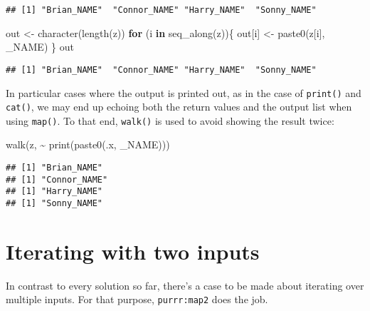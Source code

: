 \documentclass[
]{book}
\newenvironment{Shaded}{\begin{snugshade}}{\end{snugshade}}
\newcommand{\ControlFlowTok}[1]{\textcolor[rgb]{0.13,0.29,0.53}{\textbf{#1}}}
\newcommand{\FunctionTok}[1]{\textcolor[rgb]{0.00,0.00,0.00}{#1}}
\newcommand{\NormalTok}[1]{#1}
\newcommand{\OtherTok}[1]{\textcolor[rgb]{0.56,0.35,0.01}{#1}}
\newcommand{\SpecialCharTok}[1]{\textcolor[rgb]{0.00,0.00,0.00}{#1}}
\newcommand{\StringTok}[1]{\textcolor[rgb]{0.31,0.60,0.02}{#1}}
\begin{document}
\begin{verbatim}
## [1] "Brian_NAME"  "Connor_NAME" "Harry_NAME"  "Sonny_NAME"
\end{verbatim}

\begin{Shaded}
\begin{Highlighting}[]
\NormalTok{out }\OtherTok{\textless{}{-}} \FunctionTok{character}\NormalTok{(}\FunctionTok{length}\NormalTok{(z))}
\ControlFlowTok{for}\NormalTok{ (i }\ControlFlowTok{in} \FunctionTok{seq\_along}\NormalTok{(z))\{}
\NormalTok{  out[i] }\OtherTok{\textless{}{-}} \FunctionTok{paste0}\NormalTok{(z[i], }\StringTok{\textquotesingle{}\_NAME\textquotesingle{}}\NormalTok{)}
\NormalTok{\}}
\NormalTok{out}
\end{Highlighting}
\end{Shaded}

\begin{verbatim}
## [1] "Brian_NAME"  "Connor_NAME" "Harry_NAME"  "Sonny_NAME"
\end{verbatim}

In particular cases where the output is printed out, as in the case of \texttt{print()} and \texttt{cat()}, we may end up echoing both the return values and the output list when using \texttt{map()}. To that end, \texttt{walk()} is used to avoid showing the result twice:

\begin{Shaded}
\begin{Highlighting}[]
\FunctionTok{walk}\NormalTok{(z, }\SpecialCharTok{\textasciitilde{}} \FunctionTok{print}\NormalTok{(}\FunctionTok{paste0}\NormalTok{(.x, }\StringTok{\textquotesingle{}\_NAME\textquotesingle{}}\NormalTok{)))}
\end{Highlighting}
\end{Shaded}

\begin{verbatim}
## [1] "Brian_NAME"
## [1] "Connor_NAME"
## [1] "Harry_NAME"
## [1] "Sonny_NAME"
\end{verbatim}

\hypertarget{iterating-with-two-inputs}{%
\section{Iterating with two inputs}\label{iterating-with-two-inputs}}

In contrast to every solution so far, there's a case to be made about iterating over multiple inputs. For that purpose, \texttt{purrr:map2} does the job.
\end{document}

